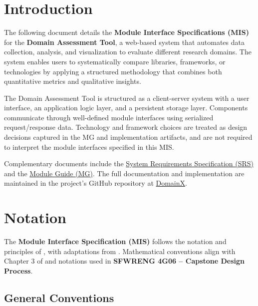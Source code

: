\documentclass[12pt, titlepage]{article}
\begin{document}
\newpage


\section{Introduction}

The following document details the \textbf{Module Interface Specifications (MIS)} for the
\textbf{Domain Assessment Tool}, a web-based system that automates data collection,
analysis, and visualization to evaluate different research domains.
The system enables users to systematically compare libraries, frameworks, or technologies
by applying a structured methodology that combines both quantitative metrics and
qualitative insights.

The Domain Assessment Tool is structured as a client-server system with a user interface,
an application logic layer, and a persistent storage layer. Components communicate through
well-defined module interfaces using serialized request/response data. Technology and
framework choices are treated as design decisions captured in the MG and implementation
artifacts, and are not required to interpret the module interfaces specified in this MIS.


Complementary documents include the
\href{https://github.com/thaafei/DomainX/blob/main/docs/SRS/SRS.pdf}
{System Requirements Specification (SRS)} and the
\href{https://github.com/thaafei/DomainX/blob/main/docs/Design/SoftArchitecture/MG.pdf}
{Module Guide (MG)}.
The full documentation and implementation are maintained in the project’s GitHub repository at
\href{https://github.com/thaafei/DomainX}{DomainX}.


\section{Notation}

The \textbf{Module Interface Specification (MIS)} follows the notation and principles of
\citet{HoffmanAndStrooper1995}, with adaptations from \citet{GhezziEtAl2003}.
Mathematical conventions align with Chapter 3 of \citet{HoffmanAndStrooper1995} and
notations used in \textbf{SFWRENG 4G06 – Capstone Design Process}.

\subsection{General Conventions}
\end{document}
